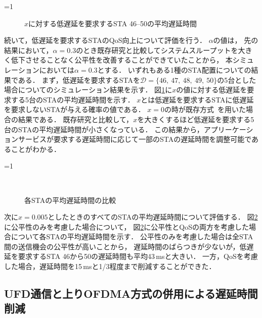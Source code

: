 \documentclass[master]{kuisthesis}		%
\newcounter{flagFig}
\begin{document}
			\par
			\ifnum\value{flagFig}=1 {\begin{figure}[htbp]
				\centering
				\caption{$x$に対する低遅延を要求するSTA 46--50の平均遅延時間}
				\label{fig:chnx}
			\end{figure}}\fi
			続いて，低遅延を要求するSTAのQoS向上について評価を行う．
			$\alpha$の値は，
			先の結果において，$\alpha=0.3$のとき既存研究と比較してシステムスループットを大きく低下させることなく公平性を改善することができていたことから，
			本シミュレーションにおいては$\alpha=0.3$とする．
			いずれもある1種のSTA配置についての結果である．
			まず，低遅延を要求するSTAを${\mathcal D}=\{46,\ 47,\ 48,\ 49,\ 50\}$の5台とした場合についてのシミュレーション結果を示す．
			図\ref{fig:chnx}に$x$の値に対する低遅延を要求する5台のSTAの平均遅延時間を示す．
			$x$とは低遅延を要求するSTAに低遅延を要求しないSTAが与える確率の値である．
			$x=0$の時が既存方式~\cite{promac}を用いた場合の結果である．
			既存研究と比較して，$x$を大きくするほど低遅延を要求する5台のSTAの平均遅延時間が小さくなっている．
			この結果から，アプリーケーションサービスが要求する遅延時間に応じて一部のSTAの遅延時間を調整可能であることがわかる．
			\par
			\ifnum\value{flagFig}=1 {\begin{figure}[htbp]
				\centering
				\\
				\caption{各STAの平均遅延時間の比較}
				\label{fig:inter}
			\end{figure}}\fi
			次に$x=0.005$としたときのすべてのSTAの平均遅延時間について評価する．
			図\ref{fig:inter}に公平性のみを考慮した場合について，
			図\ref{fig:inter}に公平性とQoSの両方を考慮した場合について各STAの平均遅延時間を示す．
			公平性のみを考慮した場合は全STA間の送信機会の公平性が高いことから，
			遅延時間のばらつきが少ないが，低遅延を要求するSTA 46から50の遅延時間も平均43\,msと大きい．
			一方，QoSを考慮した場合，遅延時間を15\,msと1/3程度まで削減することができた．

	\subsection{UFD通信と上りOFDMA方式の併用による遅延時間削減}
\end{document}
